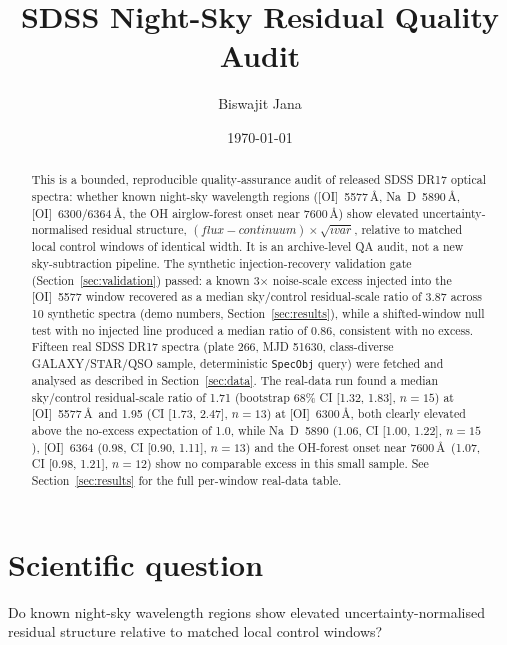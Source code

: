 \documentclass[11pt]{article}
\title{SDSS Night-Sky Residual Quality Audit}
\author{Biswajit Jana}
\date{\today}
\begin{document}
\maketitle

\begin{abstract}
This is a bounded, reproducible quality-assurance audit of released SDSS
DR17 optical spectra: whether known night-sky wavelength regions
([OI]~5577\,\AA, Na~D~5890\,\AA, [OI]~6300/6364\,\AA, the OH airglow-forest
onset near 7600\,\AA) show elevated uncertainty-normalised residual
structure, $(flux-continuum)\times\sqrt{ivar}$, relative to matched local
control windows of identical width. It is an archive-level QA audit, not a
new sky-subtraction pipeline. The synthetic injection-recovery validation
gate (Section~\ref{sec:validation}) passed: a known 3$\times$ noise-scale
excess injected into the [OI]~5577 window recovered as a median sky/control
residual-scale ratio of 3.87 across 10 synthetic spectra (demo numbers,
Section~\ref{sec:results}), while a shifted-window null test with no
injected line produced a median ratio of 0.86, consistent with no excess.
Fifteen real SDSS DR17 spectra (plate 266, MJD 51630, class-diverse
GALAXY/STAR/QSO sample, deterministic \texttt{SpecObj} query) were fetched
and analysed as described in Section~\ref{sec:data}. The real-data run found
a median sky/control residual-scale ratio of 1.71 (bootstrap 68\% CI
[1.32, 1.83], $n=15$) at [OI]~5577\,\AA\ and 1.95 (CI [1.73, 2.47], $n=13$)
at [OI]~6300\,\AA, both clearly elevated above the no-excess expectation of
1.0, while Na~D~5890 (1.06, CI [1.00, 1.22], $n=15$), [OI]~6364 (0.98, CI
[0.90, 1.11], $n=13$) and the OH-forest onset near 7600\,\AA\ (1.07, CI
[0.98, 1.21], $n=12$) show no comparable excess in this small sample. See
Section~\ref{sec:results} for the full per-window real-data table.
\end{abstract}

\section{Scientific question}
Do known night-sky wavelength regions show elevated uncertainty-normalised
residual structure relative to matched local control windows?
\end{document}
